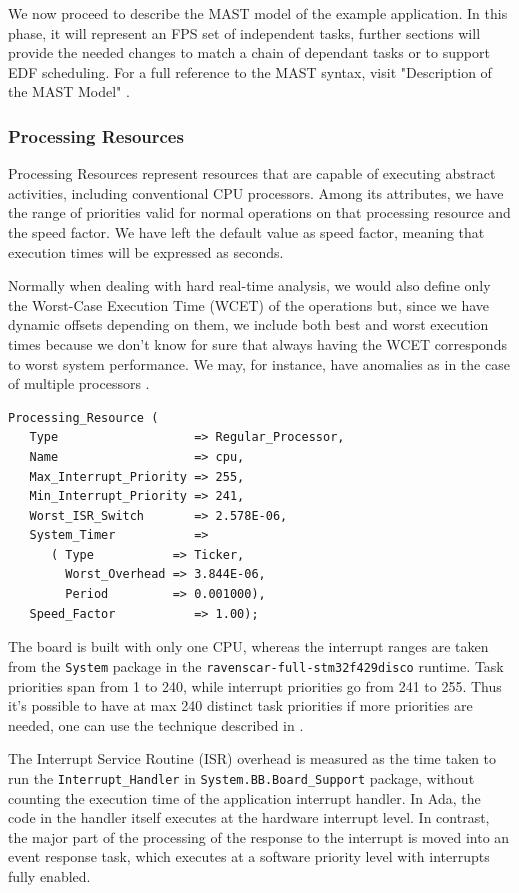 \documentclass{article}
\begin{document}
We now proceed to describe the MAST model of the example application. In this phase, it will represent an FPS set of independent tasks, further sections will provide the needed changes to match a chain of dependant tasks or to support EDF scheduling. For a full reference to the MAST syntax, visit "Description of the MAST Model" \cite{mast-description}.

\subsubsection{Processing Resources}\label{processing-resources}

Processing Resources represent resources that are capable of executing abstract activities, including conventional CPU processors. Among its attributes, we have the range of priorities valid for normal operations on that processing resource and the speed factor. We have left the default value as speed factor, meaning that execution times will be expressed as seconds.

Normally when dealing with hard real-time analysis, we would also define only the Worst-Case Execution Time (WCET) of the operations but, since we have dynamic offsets depending on them, we include both best and worst execution times because we don't know for sure that always having the WCET corresponds to worst system performance. We may, for instance, have anomalies as in the case of multiple processors \cite{anomalies-multiprocessor}.

\begin{lstlisting}
Processing_Resource (
   Type                   => Regular_Processor,
   Name                   => cpu,
   Max_Interrupt_Priority => 255,
   Min_Interrupt_Priority => 241,
   Worst_ISR_Switch       => 2.578E-06,
   System_Timer           =>
      ( Type           => Ticker,
        Worst_Overhead => 3.844E-06,
        Period         => 0.001000),
   Speed_Factor           => 1.00);
\end{lstlisting}

The board is built with only one CPU, whereas the interrupt ranges are taken from the \texttt{System} package in the \texttt{ravenscar-full-stm32f429disco} runtime. Task priorities span from 1 to 240, while interrupt priorities go from 241 to 255. Thus it's possible to have at max 240 distinct task priorities if more priorities are needed, one can use the technique described in \cite{limited-priorities}.

The Interrupt Service Routine (ISR) overhead is measured as the time taken to run the \texttt{Interrupt\_Handler} in \texttt{System.BB.Board\_Support} package, without counting the execution time of the application interrupt handler. In Ada, the code in the handler itself executes at the hardware interrupt level. In contrast, the major part of the processing of the response to the interrupt is moved into an event response task, which executes at a software priority level with interrupts fully enabled.
\end{document}
